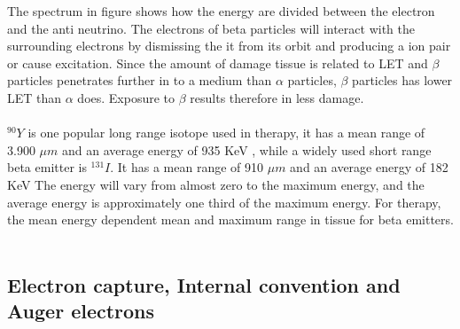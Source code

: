 \documentclass[twoside,english]{uiofysmaster/uiofysmaster}
\begin{document}
The spectrum in figure %
shows how the energy are divided between the electron and the anti neutrino. The electrons of beta particles will interact with the surrounding electrons by dismissing the it from its orbit and producing a ion pair or cause excitation. Since the amount of damage tissue is related to LET and $\beta$ particles penetrates further in to a medium than $\alpha$ particles, $\beta$ particles has lower LET than $\alpha$ does. Exposure to $\beta$ results therefore in less damage.\\
\\
$^{90}Y$ is one popular long range isotope used in therapy, it has a mean range of 3.900 $\mu m$ and an average energy of 935 KeV%
, while a widely used short range beta emitter is $^{131}I$. It has a mean range of 910 $\mu m$ and an average energy of 182 KeV%
 The energy will vary from almost zero to the maximum energy, and the average energy is approximately one third of the maximum energy. For therapy, the mean energy dependent mean and maximum range in tissue for beta emitters. 
\\
\\

\subsection{Electron capture, Internal convention and Auger electrons}
\end{document}
